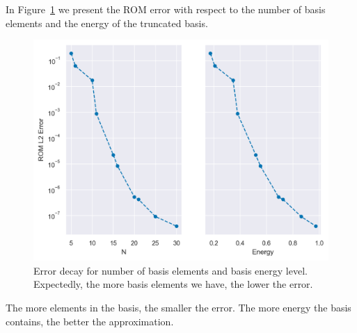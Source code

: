 \documentclass[../../thesis.tex]{subfiles}
\begin{document}
In Figure~\ref{fig:error_decay} we present the ROM error with respect to the number of basis elements and the energy of the truncated basis.
\begin{figure}[h]
    \centering
    \includegraphics[width=\columnwidth]{research_project/piston/figures/rb_certification/error_decay.png}
    \caption{Error decay for number of basis elements and basis energy level.
    Expectedly, the more basis elements we have, the lower the error.}
    \label{fig:error_decay}
\end{figure}
The more elements in the basis, the smaller the error.
The more energy the basis contains, the better the approximation.
\end{document}
